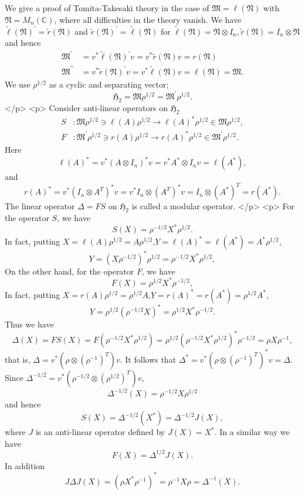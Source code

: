 We give a proof  of Tomita-Takesaki theory in the case of 
$\mathfrak{M}=\ell(\mathfrak{N})$ with $\mathfrak{N}=M_n(\mathbb{C})$,
where all difficulties in the theory vanish.
We have 
$\tilde{\ell}(\mathfrak{N})^\prime=\tilde{r}(\mathfrak{N})$ and $\tilde{r}(\mathfrak{N})^\prime=\tilde{\ell}(\mathfrak{N})$ for 
$
\tilde{\ell}(\mathfrak{N})=\mathfrak{N}\otimes I_n,\tilde{r}(\mathfrak{N})=I_n\otimes \mathfrak{N}
$
and hence 
$$
\begin{split}
\mathfrak{M}^\prime&=v^\ast \tilde{\ell}(\mathfrak{N})^\prime v= v^\ast \tilde{r}(\mathfrak{N})v=r(\mathfrak{N}) \\
\mathfrak{M}^{\prime\prime}&=v^\ast \tilde{r}(\mathfrak{N})^\prime v= v^\ast \tilde{\ell}(\mathfrak{N})v=\ell(\mathfrak{N})=\mathfrak{M}.
\end{split}
$$
We use $\rho^{1/2}$ as a cyclic and separating vector;
$$
\mathfrak{H}_2=\mathfrak{M}\rho^{1/2}=\mathfrak{M}^\prime \rho^{1/2}.
$$
</p>
<p>  Consider  anti-linear operators on $\mathfrak{H}_2$ 
	$$
	 \begin{split}
		 S&:\mathfrak{M}\rho^{1/2}\ni \ell(A) \rho^{1/2} \to \ell(A)^\ast\rho^{1/2}\in\mathfrak{M}\rho^{1/2},\\
		 F&:\mathfrak{M}^\prime \rho^{1/2}\ni r(A) \rho^{1/2} \to r(A)^\ast\rho^{1/2}\in \mathfrak{M}^\prime \rho^{1/2}.
	 \end{split}
	$$
	Here 
	$$
	\ell(A)^\ast=v^\ast(A\otimes I_n)^\ast v=v^\ast A^\ast \otimes I_n v=\ell(A^\ast),
	$$
	and
	$$
  r(A)^\ast=v^\ast (I_n\otimes A^T)^\ast v=v^\ast I_n\otimes (A^T)^\ast v=I_n\otimes (A^\ast)^T=r(A^\ast).
	$$
	The linear operator $\Delta=FS$ on $\mathfrak{H}_2$ is called a modular operator.
</p>
<p>
For the operator $S$, we have 
	$$
    S(X)=\rho^{-1/2}X^*\rho^{1/2}.
 	$$
	In fact, putting $X=\ell(A)\rho^{1/2}=A\rho^{1/2}$,$Y=\ell(A)^\ast=\ell(A^\ast)=A^\ast \rho^{1/2}$,
	$$
    Y=(X\rho^{-1/2})^\ast \rho^{1/2}=\rho^{-1/2}X^\ast\rho^{1/2},
  $$
On the other hand, for the operator $F$, we have
$$
F(X)=\rho^{1/2}X^\ast \rho^{-1/2},
$$
In fact, putting $X=r(A)\rho^{1/2}=\rho^{1/2}A$,$Y=r(A)^\ast=r(A^\ast)= \rho^{1/2}A^\ast$,
	$$
    Y= \rho^{1/2}(\rho^{-1/2}X)^\ast=\rho^{1/2}X^\ast\rho^{-1/2}.
  $$
Thus we have
$$
\Delta(X)=FS(X)=F(\rho^{-1/2}X^*\rho^{1/2})=\rho^{1/2}(\rho^{-1/2}X^*\rho^{1/2})^\ast \rho^{-1/2}=\rho X \rho^{-1},
$$
that is, $\Delta=v^\ast(\rho \otimes ({\rho}^{-1})^T) v$.
It follows that $\Delta^\ast=v^\ast (\rho\otimes({\rho}^{-1})^T)^\ast v=\Delta$.
Since $\Delta^{-1/2}=v^\ast(\rho^{-1/2}\otimes ({\rho}^{1/2})^T) v$, 
$$
\Delta^{-1/2}(X)=\rho^{-1/2}X\rho^{1/2}
$$
and hence 
$$
S(X)=\Delta^{-1/2}(X^\ast)=\Delta^{-1/2}J(X),
$$
where $J$ is an anti-linear operator defined by $J(X)=X^\ast$.
In a similar way we have
$$
F(X)=\Delta^{1/2}J(X).
$$
In addition 
$$
J\Delta J(X)=(\rho X^\ast \rho^{-1})^\ast=\rho^{-1}X\rho=\Delta^{-1}(X).
$$


